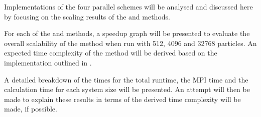 Implementations of the four parallel schemes
will be analysed and discussed here by focusing on
the scaling results of
the \individualoperation{} and \pairoperation{} methods.

For each of the \individualoperation{} and \pairoperation{} methods,
a speedup graph will be presented to evaluate the overall scalability
of the method when run with 512, 4096 and 32768 particles.
%
An expected time complexity of the method will be derived based on
the implementation outlined in
.

A detailed breakdown of the times for the total runtime, the MPI time
and the calculation time for each system size will be presented.
%
An attempt will then be made to explain these results in terms of the
derived time complexity will be made, if possible.
